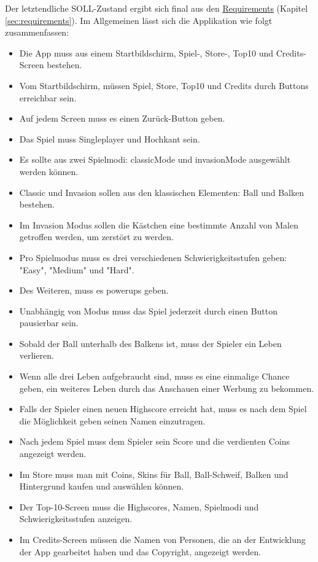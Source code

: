 Der letztendliche SOLL-Zustand ergibt sich final aus den \hyperref[sec:requirements]{Requirements} (Kapitel \ref{sec:requirements}).
Im Allgemeinen lässt sich die Applikation wie folgt zusammenfassen:

\begin{itemize}
    \item Die App muss aus einem Startbildschirm, Spiel-, Store-, \gls{Top10} und Credits-Screen bestehen.
    \item Vom Startbildschirm, müssen Spiel, Store, \gls{Top10} und Credits durch Buttons erreichbar sein.
    \item Auf jedem Screen muss es einen Zurück-Button geben.
    \item Das Spiel muss Singleplayer und Hochkant sein.
    \item Es \gls{sollte} aus zwei Spielmodi: \gls{classicMode} und \gls{invasionMode} ausgewählt werden können.
    \item Classic und Invasion sollen aus den klassischen Elementen: Ball und Balken bestehen.
    \item Im Invasion Modus sollen die Kästchen eine bestimmte Anzahl von Malen getroffen werden, um zerstört zu werden.
    \item Pro Spielmodus muss es drei verschiedenen Schwierigkeitsstufen geben: "Easy", "Medium" und "Hard".
    \item Des Weiteren, muss es \glspl{powerup} geben.
    \item Unabhängig von Modus muss das Spiel jederzeit durch einen Button pausierbar sein.
    \item Sobald der Ball unterhalb des Balkens ist, muss der Spieler ein Leben verlieren.
    \item Wenn alle drei Leben aufgebraucht sind, muss es eine einmalige Chance geben, ein weiteres Leben durch das Anschauen einer Werbung zu bekommen.
    \item Falls der Spieler einen neuen Highscore erreicht hat, muss es nach dem Spiel die Möglichkeit geben seinen Namen einzutragen.
    \item Nach jedem Spiel muss dem Spieler sein Score und die verdienten Coins angezeigt werden.
    \item Im Store muss man mit Coins, Skins für Ball, Ball-Schweif, Balken und Hintergrund kaufen und auswählen können.
    \item Der Top-10-Screen muss die Highscores, Namen, Spielmodi und Schwie\-rig\-keits\-stufen anzeigen.
    \item Im Credits-Screen müssen die Namen von Personen, die an der Entwicklung der App gearbeitet haben und das Copyright, angezeigt werden.
\end{itemize}
